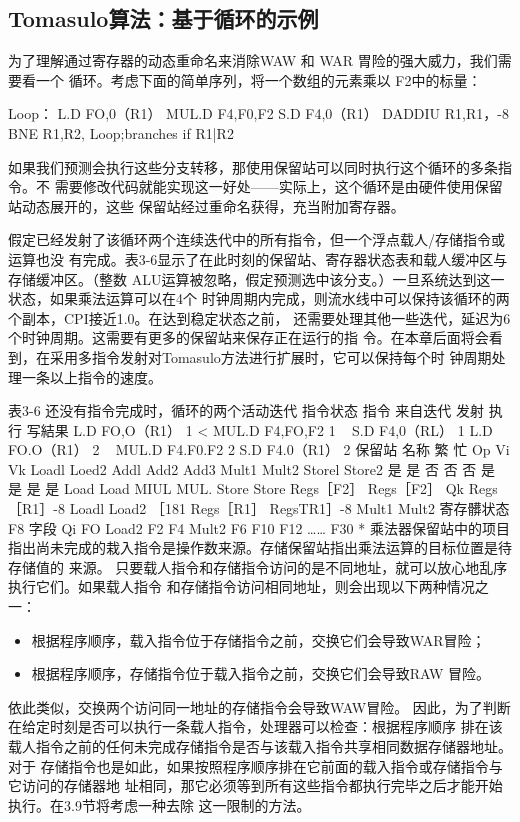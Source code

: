 \subsection{Tomasulo算法：基于循环的示例}
为了理解通过寄存器的动态重命名来消除WAW 和 WAR 胃险的强大威力，我们需要看一个
循环。考虑下面的简单序列，将一个数组的元素乘以 F2中的标量：

Loop：
L.D
FO,0（R1）
MUL.D
F4,F0,F2
S.D
F4,0（R1）
DADDIU
R1,R1，-8
BNE
R1,R2, Loop;branches if R1|R2

如果我们预测会执行这些分支转移，那使用保留站可以同时执行这个循环的多条指令。不
需要修改代码就能实现这一好处——实际上，这个循环是由硬件使用保留站动态展开的，这些
保留站经过重命名获得，充当附加寄存器。

假定已经发射了该循环两个连续迭代中的所有指令，但一个浮点载人/存储指令或运算也没
有完成。表3-6显示了在此时刻的保留站、寄存器状态表和载人缓冲区与存储缓冲区。（整数
ALU运算被忽略，假定预测选中该分支。）一旦系统达到这一状态，如果乘法运算可以在4个
时钟周期内完成，则流水线中可以保持该循环的两个副本，CPI接近1.0。在达到稳定状态之前，
还需要处理其他一些迭代，延迟为6个时钟周期。这需要有更多的保留站来保存正在运行的指
令。在本章后面将会看到，在采用多指令发射对Tomasulo方法进行扩展时，它可以保持每个时
钟周期处理一条以上指令的速度。

表3-6 还没有指令完成时，循环的两个活动迭代
指令状态
指令
来自迭代
发射
执行
写結果
L.D
FO,O（R1）
1
<
MUL.D
F4,FO,F2
1
~
S.D
F4,0（RL）
1
L.D
FO.O（R1）
2
~
MUL.D
F4.F0.F2
2
S.D
F4.0（R1）
2
保留站
名称
繁
忙
Op
Vi
Vk
Loadl
Loed2
Addl
Add2
Add3
Mult1
Mult2
Storel
Store2
是
是
否
否
否
是
是
是
是
Load
Load
MIUL
MUL.
Store
Store
Regs［F2］
Regs［F2］
Qk
Regs［R1］-8
Loadl
Load2
［181
Regs［R1］
RegsTR1］-8
Mult1
Mult2
寄存髒状态
F8
字段
Qi
FO
Load2
F2
F4
Mult2
F6
F10
F12
……
F30
* 乘法器保留站中的项目指出尚未完成的栽入指令是操作数来源。存储保留站指出乘法运算的目标位置是待存储值的
来源。
只要载人指令和存储指令访问的是不同地址，就可以放心地乱序执行它们。如果载人指令
和存储指令访问相同地址，则会出现以下两种情况之一：
\begin{itemize}
    \item 根据程序顺序，载入指令位于存储指令之前，交换它们会导致WAR冒险；
    \item 根据程序顺序，存储指令位于载入指令之前，交换它们会导致RAW 冒险。
\end{itemize}
依此类似，交换两个访问同一地址的存储指令会导致WAW冒险。
因此，为了判断在给定时刻是否可以执行一条载人指令，处理器可以检查：根据程序顺序
排在该载人指令之前的任何未完成存储指令是否与该载入指令共享相同数据存储器地址。对于
存储指令也是如此，如果按照程序顺序排在它前面的载入指令或存储指令与它访问的存储器地
址相同，那它必须等到所有这些指令都执行完毕之后才能开始执行。在3.9节将考虑一种去除
这一限制的方法。

